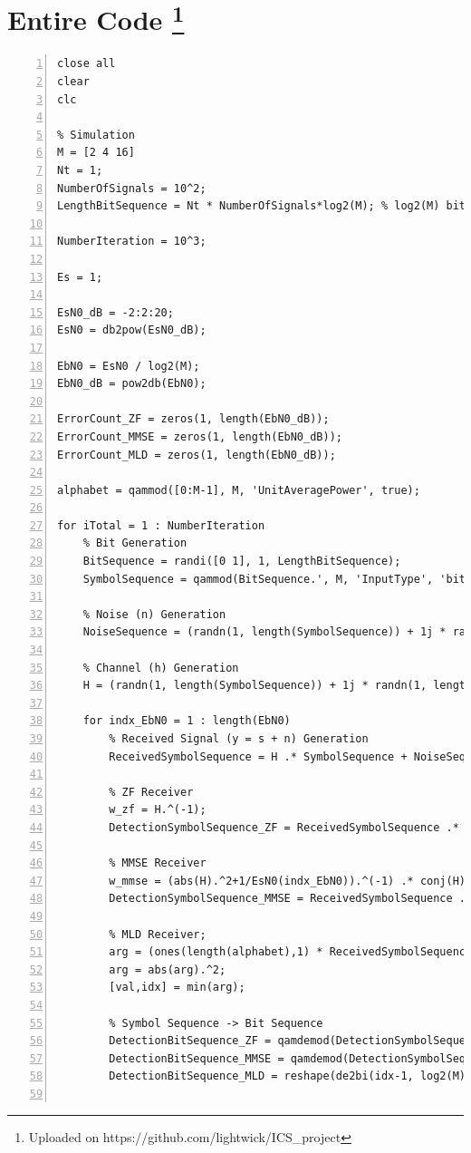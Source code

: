 \documentclass{article}
\begin{document}
\section[Entire Code]{Entire Code \footnote{Uploaded on https://github.com/lightwick/ICS\_project}}
\begin{lstlisting}[style=Matlab-editor, frame=single, numbers=left,]
close all
clear
clc

% Simulation
M = [2 4 16]
Nt = 1;
NumberOfSignals = 10^2;
LengthBitSequence = Nt * NumberOfSignals*log2(M); % log2(M) bits per signal

NumberIteration = 10^3;

Es = 1;

EsN0_dB = -2:2:20;
EsN0 = db2pow(EsN0_dB);

EbN0 = EsN0 / log2(M);
EbN0_dB = pow2db(EbN0);

ErrorCount_ZF = zeros(1, length(EbN0_dB));
ErrorCount_MMSE = zeros(1, length(EbN0_dB));
ErrorCount_MLD = zeros(1, length(EbN0_dB));

alphabet = qammod([0:M-1], M, 'UnitAveragePower', true);

for iTotal = 1 : NumberIteration
    % Bit Generation
    BitSequence = randi([0 1], 1, LengthBitSequence);
    SymbolSequence = qammod(BitSequence.', M, 'InputType', 'bit', 'UnitAveragePower', 1).';

    % Noise (n) Generation
    NoiseSequence = (randn(1, length(SymbolSequence)) + 1j * randn(1, length(SymbolSequence))) / sqrt(2);

    % Channel (h) Generation
    H = (randn(1, length(SymbolSequence)) + 1j * randn(1, length(SymbolSequence))) ./ sqrt(2);

    for indx_EbN0 = 1 : length(EbN0)
        % Received Signal (y = s + n) Generation
        ReceivedSymbolSequence = H .* SymbolSequence + NoiseSequence * sqrt(1 / EsN0(indx_EbN0));

        % ZF Receiver
        w_zf = H.^(-1);
        DetectionSymbolSequence_ZF = ReceivedSymbolSequence .* w_zf; % Detection (Zero-Forcing: y / h)

        % MMSE Receiver
        w_mmse = (abs(H).^2+1/EsN0(indx_EbN0)).^(-1) .* conj(H);
        DetectionSymbolSequence_MMSE = ReceivedSymbolSequence .* w_mmse;;
        
        % MLD Receiver;
        arg = (ones(length(alphabet),1) * ReceivedSymbolSequence) - (alphabet.' * H);
        arg = abs(arg).^2;
        [val,idx] = min(arg);

        % Symbol Sequence -> Bit Sequence
        DetectionBitSequence_ZF = qamdemod(DetectionSymbolSequence_ZF.', M, 'OutputType', 'bit', 'UnitAveragePower', 1)'; % Detection
        DetectionBitSequence_MMSE = qamdemod(DetectionSymbolSequence_MMSE.', M, 'OutputType', 'bit', 'UnitAveragePower', 1)'; % tmp value;
        DetectionBitSequence_MLD = reshape(de2bi(idx-1, log2(M), 'left-msb')', 1, []);


\end{lstlisting}
\end{document}
